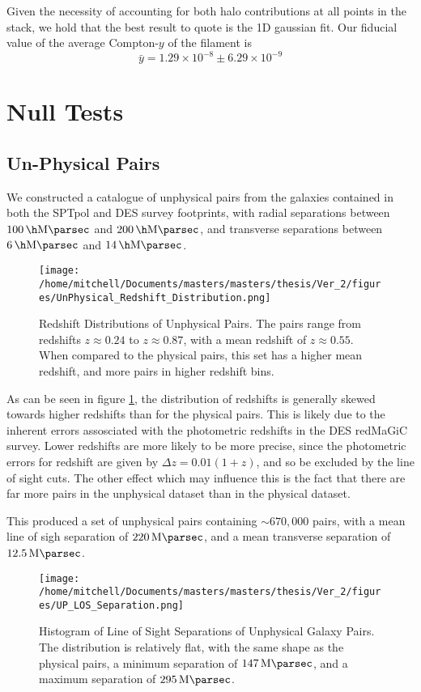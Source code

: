 Given the necessity of accounting for both halo contributions at all points in the stack, we hold that the best result to quote is the 1D gaussian fit. Our fiducial value of the average Compton-$y$ of the filament is 
\begin{equation}
\boxed{\bar y = 1.29 \times 10^{-8} \pm 6.29 \times 10^{-9}}
\end{equation}
\section{Null Tests}
\subsection{Un-Physical Pairs}
We constructed a catalogue of unphysical pairs from the galaxies contained in both the SPTpol and DES survey footprints, with radial separations between $\SI{100}{\per\h\mega\parsec}$ and $\SI{200}{\per\h\mega\parsec}$, and transverse separations between $\SI{6}{\per\h\mega\parsec}$ and $\SI{14}{\per\h\mega\parsec}$. 

\begin{figure}[h!]
\centering
\texttt{[image: /home/mitchell/Documents/masters/masters/thesis/Ver\_2/figures/UnPhysical\_Redshift\_Distribution.png]}
\caption{Redshift Distributions of Unphysical Pairs. The pairs range from redshifts $z\approx0.24$ to $z\approx0.87$, with a mean redshift of $z\approx0.55$. When compared to the physical pairs, this set has a higher mean redshift, and more pairs in higher redshift bins.   }
\label{fig:unphysical:redshifts}
\end{figure}
As can be seen in figure \ref{fig:unphysical:redshifts}, the distribution of redshifts is generally skewed towards higher redshifts than for the physical pairs. This is likely due to the inherent errors assosciated with the photometric redshifts in the DES redMaGiC survey. Lower redshifts are more likely to be more precise, since the photometric errors for redshift are given by $\Delta z= 0.01(1+z)$, and so be excluded by the line of sight cuts. The other effect which may influence this is the fact that there are far more pairs in the unphysical dataset than in the physical dataset. 


This produced a set of unphysical pairs containing $\sim 670,000$ pairs, with a mean line of sigh separation of $\SI{220}{\mega\parsec}$, and a mean transverse separation of $\SI{12.5}{\mega\parsec}$.


\begin{figure}[h!]
\centering
\texttt{[image: /home/mitchell/Documents/masters/masters/thesis/Ver\_2/figures/UP\_LOS\_Separation.png]}
\caption{Histogram of Line of Sight Separations of Unphysical Galaxy Pairs. The distribution is relatively flat, with the same shape as the physical pairs, a minimum separation of $\SI{147}{\mega\parsec}$, and a maximum separation of $\SI{295}{\mega\parsec}$.  }
\label{fig:unphysical:lineofsight}
\end{figure}

